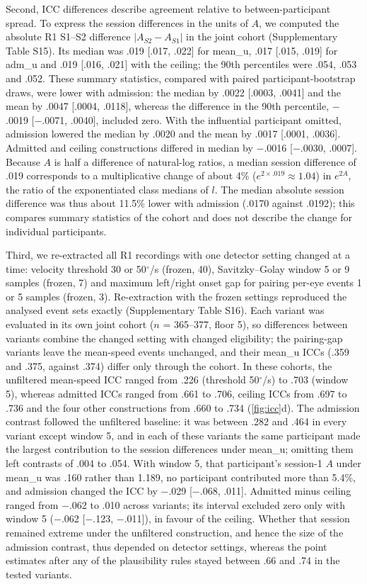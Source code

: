 Second, ICC differences describe agreement relative to between-participant spread. To express the session differences in the units of $A$, we computed the absolute R1 S1--S2 difference $|A_{S2} - A_{S1}|$ in the joint cohort (Supplementary Table S15). Its median was .019 [.017, .022] for mean\_u, .017 [.015, .019] for adm\_u and .019 [.016, .021] with the ceiling; the 90th percentiles were .054, .053 and .052. These summary statistics, compared with paired participant-bootstrap draws, were lower with admission: the median by .0022 [.0003, .0041] and the mean by .0047 [.0004, .0118], whereas the difference in the 90th percentile, $-$.0019 [$-$.0071, .0040], included zero. With the influential participant omitted, admission lowered the median by .0020 and the mean by .0017 [.0001, .0036]. Admitted and ceiling constructions differed in median by $-$.0016 [$-$.0030, .0007]. Because $A$ is half a difference of natural-log ratios, a median session difference of .019 corresponds to a multiplicative change of about 4\% ($e^{2 \times .019} \approx 1.04$) in $e^{2A}$, the ratio of the exponentiated class medians of $l$. The median absolute session difference was thus about 11.5\% lower with admission (.0170 against .0192); this compares summary statistics of the cohort and does not describe the change for individual participants.

Third, we re-extracted all R1 recordings with one detector setting changed at a time: velocity threshold 30 or 50$^\circ$/s (frozen, 40), Savitzky--Golay window 5 or 9 samples (frozen, 7) and maximum left/right onset gap for pairing per-eye events 1 or 5 samples (frozen, 3). Re-extraction with the frozen settings reproduced the analysed event sets exactly (Supplementary Table S16). Each variant was evaluated in its own joint cohort ($n$ = 365--377, floor 5), so differences between variants combine the changed setting with changed eligibility; the pairing-gap variants leave the mean-speed events unchanged, and their mean\_u ICCs (.359 and .375, against .374) differ only through the cohort. In these cohorts, the unfiltered mean-speed ICC ranged from .226 (threshold 50$^\circ$/s) to .703 (window 5), whereas admitted ICCs ranged from .661 to .706, ceiling ICCs from .697 to .736 and the four other constructions from .660 to .734 (\cref{fig:icc}d). The admission contrast followed the unfiltered baseline: it was between .282 and .464 in every variant except window 5, and in each of these variants the same participant made the largest contribution to the session differences under mean\_u; omitting them left contrasts of .004 to .054. With window 5, that participant's session-1 $A$ under mean\_u was .160 rather than 1.189, no participant contributed more than 5.4\%, and admission changed the ICC by $-$.029 [$-$.068, .011]. Admitted minus ceiling ranged from $-$.062 to .010 across variants; its interval excluded zero only with window 5 ($-$.062 [$-$.123, $-$.011]), in favour of the ceiling. Whether that session remained extreme under the unfiltered construction, and hence the size of the admission contrast, thus depended on detector settings, whereas the point estimates after any of the plausibility rules stayed between .66 and .74 in the tested variants.

